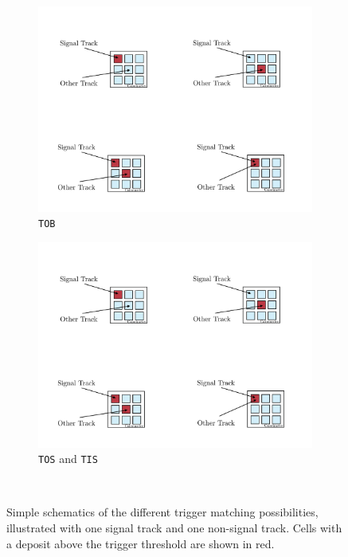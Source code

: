 \begin{figure}[!h]
\begin{subfigure}[t]{0.4\textwidth}
        \includegraphics[width=1.0\textwidth]{figs/Selection/Tob.pdf}
        \caption{\texttt{TOB}}
        \label{fig:TOB}
    \end{subfigure}
    \begin{subfigure}[t]{0.4\textwidth}
        \includegraphics[width=1.0\textwidth]{figs/Selection/TisTos.pdf}
        \caption{\texttt{TOS} and \texttt{TIS}}
        \label{fig:TOSandTIS}
    \end{subfigure}\\
    \caption{Simple schematics of the different trigger matching possibilities, illustrated with one signal track and one non-signal track. Cells with a deposit above the trigger threshold are shown in red. }
    \label{fig:tistostobbing}   
\end{figure}


